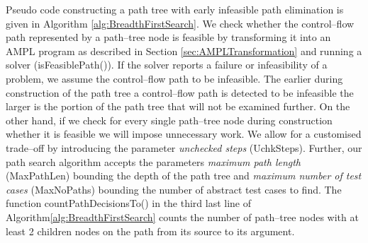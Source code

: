 \documentclass[runningheads,a4paper]{llncs}%
\newcommand{\UMLType}[1]{\textsf{\textit{#1}}} %
\begin{document}
Pseudo code constructing a path tree with early infeasible path elimination is given in Algorithm \ref{alg:BreadthFirstSearch}. We check whether the control--flow path represented by a path--tree node is feasible by transforming it into an AMPL program as described in Section \ref{sec:AMPLTransformation} and running a solver (isFeasiblePath()). If the solver reports a failure or infeasibility of a problem, we assume the control--flow path to be infeasible. The earlier during construction of the path tree a control--flow path is detected to be infeasible the larger is the portion of the path tree that will not be examined further. On the other hand, if we check for every single path--tree node during construction whether it is feasible we will impose unnecessary work. We allow for a customised trade--off by introducing the parameter \emph{unchecked steps} (UchkSteps). Further, our path search algorithm accepts the parameters \emph{maximum path length} (MaxPathLen) bounding the depth of the path tree and \emph{maximum number of test cases} (MaxNoPaths) bounding the number of abstract test cases to find. The function countPathDecisionsTo() in the third last line of Algorithm\ref{alg:BreadthFirstSearch} counts the number of path--tree nodes with at least 2 children nodes on the path from its source to its argument. %
\end{document}
